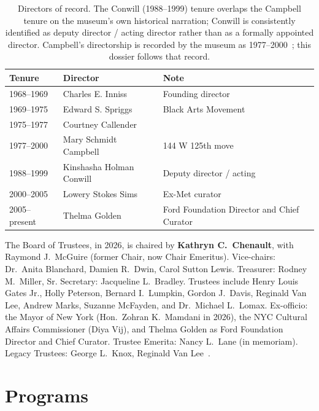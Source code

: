 \documentclass[10pt,letterpaper,twocolumn]{article}
\begin{document}
\begin{table}[h]
\footnotesize
\centering
\setlength{\tabcolsep}{3pt}
\begin{tabularx}{\columnwidth}{l>{\raggedright\arraybackslash\hspace{0pt}}X>{\raggedright\arraybackslash\hspace{0pt}}X}
\toprule
\textbf{Tenure} & \textbf{Director} & \textbf{Note} \\
\midrule
1968--1969 & Charles E. Inniss & Founding director \\
1969--1975 & Edward S. Spriggs & Black Arts Movement \\
1975--1977 & Courtney Callender & \\
1977--2000 & Mary Schmidt Campbell & 144 W 125th move \\
1988--1999 & Kinshasha Holman Conwill & Deputy director / acting \\
2000--2005 & Lowery Stokes Sims & Ex-Met curator \\
2005--present & Thelma Golden & Ford Foundation Director and Chief Curator \\
\bottomrule
\end{tabularx}
\caption{Directors of record. The Conwill (1988--1999) tenure overlaps the Campbell tenure on the museum's own historical narration; Conwill is consistently identified as deputy director / acting director rather than as a formally appointed director. Campbell's directorship is recorded by the museum as 1977--2000~\citep{smh2026history}; this dossier follows that record.}
\label{tab:directors}
\end{table}

The Board of Trustees, in 2026, is chaired by \textbf{Kathryn C.~Chenault}, with Raymond J.~McGuire (former Chair, now Chair Emeritus). Vice-chairs: Dr.~Anita Blanchard, Damien R.~Dwin, Carol Sutton Lewis. Treasurer: Rodney M.~Miller, Sr. Secretary: Jacqueline L.~Bradley. Trustees include Henry Louis Gates Jr., Holly Peterson, Bernard I.~Lumpkin, Gordon J.~Davis, Reginald Van Lee, Andrew Marks, Suzanne McFayden, and Dr.~Michael L.~Lomax. Ex-officio: the Mayor of New York (Hon.~Zohran K.~Mamdani in 2026), the NYC Cultural Affairs Commissioner (Diya Vij), and Thelma Golden as Ford Foundation Director and Chief Curator. Trustee Emerita: Nancy L.~Lane (in memoriam). Legacy Trustees: George L.~Knox, Reginald Van Lee~\citep{smh2026board}.

\section{Programs}
\end{document}

